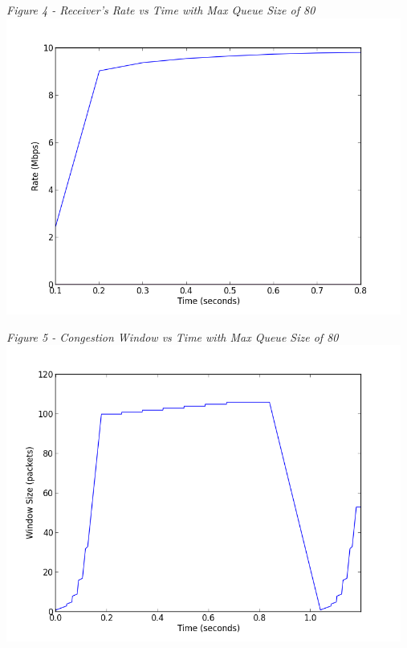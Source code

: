\documentclass[11pt]{article}
\begin{document}
\textit{Figure 4 - Receiver's Rate vs Time with Max Queue Size of 80}
\\
\includegraphics[width=13cm]{1_data/1-rate_q100}
\vspace{0.25cm}

\textit{Figure 5 - Congestion Window vs Time with Max Queue Size of 80}
\\
\includegraphics[width=13cm]{1_data/1-window_q80}
\vspace{0.25cm}
\end{document}
